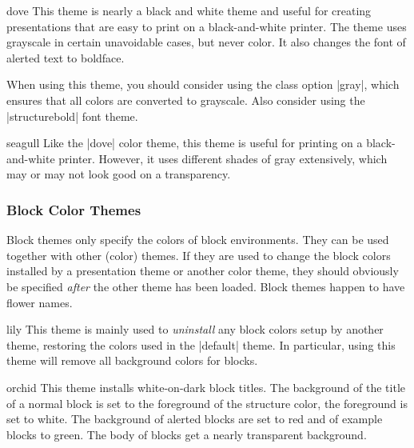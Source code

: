 \begin{colorthemeexample}{dove}
  This theme is nearly a black and white theme and useful for creating
  presentations that are easy to print on a black-and-white
  printer. The theme uses grayscale in certain unavoidable cases, but
  never color. It also changes the font of alerted text to boldface.

  When using this theme, you should consider using the class option
  |gray|, which ensures that all colors are converted to
  grayscale. Also consider using the |structurebold| font theme.
\end{colorthemeexample}



\begin{colorthemeexample}{seagull}
  Like the |dove| color theme, this theme is useful for printing on a
  black-and-white printer. However, it uses different shades of gray
  extensively, which may or may not look good on a transparency.
\end{colorthemeexample}


\subsubsection{Block Color Themes}

Block themes only specify the colors of block environments. They can
be used together with other (color) themes. If they are used to change the
block colors installed by a presentation theme or another color theme,
they should obviously be specified \emph{after} the other theme has
been loaded. Block themes happen to have flower names.

\begin{colorthemeexample}{lily}
  This theme is mainly used to \emph{uninstall} any block colors setup
  by another theme, restoring the colors used in the |default|
  theme. In particular, using this theme will remove all background
  colors for blocks.
\end{colorthemeexample}

\begin{colorthemeexample}{orchid}
  This theme installs white-on-dark block titles. The background of
  the title of a normal block is set to the foreground of the
  structure color, the foreground is set to white. The background of
  alerted blocks are set to red and of example blocks to green. The
  body of blocks get a nearly transparent background.
\end{colorthemeexample}


